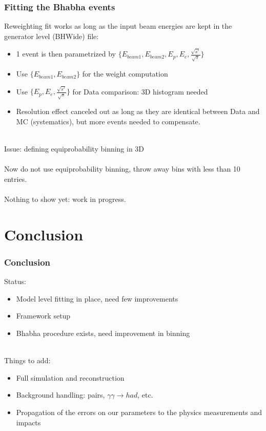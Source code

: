 \documentclass{beamer}
\begin{document}
\begin{frame}
\frametitle{Fitting the Bhabha events}
Reweighting fit works as long as the input beam energies are kept in the
generator level (BHWide) file:
\begin{itemize}
  \item 1 event is then parametrized by
  $\{E_{beam1},E_{beam2},E_{p},E_{e},\frac{\sqrt{s'}}{\sqrt{s}}\}$
  \item Use $\{E_{beam1},E_{beam2}\}$ for the weight computation
  \item Use $\{E_{p},E_{e},\frac{\sqrt{s'}}{\sqrt{s}}\}$ for Data comparison: 3D
  histogram needed
  \item Resolution effect canceled out as long as they are identical between
  Data and MC (systematics), but more events needed to compensate.
\end{itemize}
~\\
Issue: defining equiprobability binning in 3D\\
~\\
Now do not use equiprobability binning, throw away bins with less than 10
entries.\\
~\\
Nothing to show yet: \alert{work in progress}.
\end{frame}



\section{Conclusion}
\begin{frame}
\frametitle{Conclusion}
Status:
\begin{itemize}
  \item Model level fitting in place, need few improvements
  \item Framework setup
  \item Bhabha procedure exists, need improvement in binning
\end{itemize}
~\\
Things to add:
\begin{itemize}
  \item Full simulation and reconstruction
  \item Background handling: pairs, $\gamma\gamma \to had$, etc.
  \item Propagation of the errors on our parameters to the physics measurements
  and impacts
\end{itemize}
\end{frame}
\end{document}
